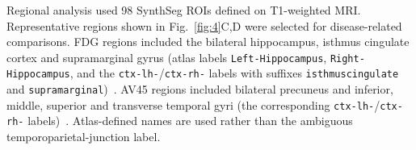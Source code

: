 Regional analysis used 98 SynthSeg ROIs defined on T1-weighted MRI. Representative regions shown in Fig.~\ref{fig:4}C,D were selected for disease-related comparisons. FDG regions included the bilateral hippocampus, isthmus cingulate cortex and supramarginal gyrus (atlas labels \texttt{Left-Hippocampus}, \texttt{Right-Hippocampus}, and the \texttt{ctx-lh-}/\allowbreak\texttt{ctx-rh-} labels with suffixes \texttt{isthmuscingulate} and \texttt{supramarginal})~\cite{mosconi2005reduced,he2015meta,strom2022cortical}. AV45 regions included bilateral precuneus and inferior, middle, superior and transverse temporal gyri (the corresponding \texttt{ctx-lh-}/\allowbreak\texttt{ctx-rh-} labels)~\cite{wong2010in}. Atlas-defined names are used rather than the ambiguous temporoparietal-junction label.
